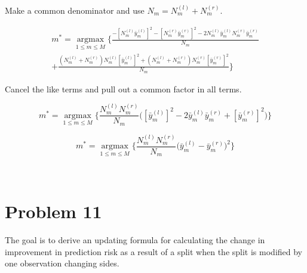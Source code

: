\documentclass[11pt]{article}
\begin{document}
Make a common denominator and use $N_m = N_m^{(l)} + N_m^{(r)}$.

\begin {equation}
\begin{split}
m^* = \underset{1 \leq m \leq M}{\operatorname{argmax}} 
\Bigg\{\frac{-[N_m^{(l)}\bar{y}_m^{(l)}]^2 - 
[N_m^{(r)}\bar{y}_m^{(r)}]^2-2N_m^{(l)}\bar{y}_m^{(l)}
N_m^{(r)}\bar{y}_m^{(r)}}{N_m}\\ 
+ \frac{(N_m^{(l)}+ N_m^{(r)})N_m^{(l)}[\bar{y}_m^{(l)}]^2 + 
(N_m^{(l)}+N_m^{(r)})N_m^{(r)}[\bar{y}_m^{(r)}]^2}{N_m}\Bigg\}
\end{split}
\end{equation}

Cancel the like terms and pull out a common factor in all terms. 

\begin{equation}
m^* = \underset{1 \leq m \leq M}{\operatorname{argmax}} 
\Bigg\{\frac{N_m^{(l)}N_m^{(r)}}{N_m}\Big([\bar{y}_m^{(l)}]^2-
2\bar{y}_m^{(l)}\bar{y}_m^{(r)} + [\bar{y}_m^{(r)}]^2\Big)\Bigg \}
\end{equation}

\begin{equation}
m^* = \underset{1 \leq m \leq M}{\operatorname{argmax}} 
\Bigg\{\frac{N_m^{(l)}N_m^{(r)}}{N_m}\Big(\bar{y}_m^{(l)} - 
\bar{y}_m^{(r)}\Big)^2\Bigg \}
\end{equation}

\newpage
\begin{center}
\ \\
\end{center}

\section*{Problem 11}
\setlength{\parindent}{0pt}

The goal is to derive an updating formula for calculating the change in 
improvement  in prediction risk as a result of a split when the split is 
modified by one observation changing sides. 
\end{document}
